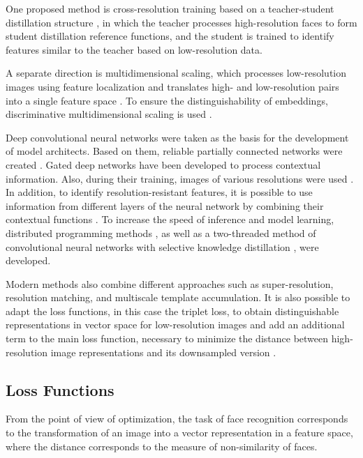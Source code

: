 \documentclass[11pt,a4paper]{article}
\begin{document}
One proposed method is cross-resolution training based on a teacher-student distillation structure \cite{15}, in which the teacher processes high-resolution faces to form student distillation reference functions, and the student is trained to identify features similar to the teacher based on low-resolution data. 

A separate direction is multidimensional scaling, which processes low-resolution images using feature localization and translates high- and low-resolution pairs into a single feature space \cite{17}. To ensure the distinguishability of embeddings, discriminative multidimensional scaling is used \cite{16}.

Deep convolutional neural networks were taken as the basis for the development of model architects. Based on them, reliable partially connected networks were created \cite{18, 19}. Gated deep networks \cite{20} have been developed to process contextual information. Also, during their training, images of various resolutions were used \cite{21}. In addition, to identify resolution-resistant features, it is possible to use information from different layers of the neural network by combining their contextual functions \cite{22}.
To increase the speed of inference and model learning, distributed programming methods \cite{23}, as well as a two-threaded method of convolutional neural networks with selective knowledge distillation \cite{15}, were developed.

Modern methods \cite{25} also combine different approaches such as super-resolution, resolution matching, and multiscale template accumulation. It is also possible to adapt the loss functions, in this case the triplet loss, to obtain distinguishable representations in vector space for low-resolution images \cite{26} and add an additional term to the main loss function, necessary to minimize the distance between high-resolution image representations and its downsampled version \cite{27}.

\subsection{Loss Functions}
From the point of view of optimization, the task of face recognition corresponds to the transformation of an image into a vector representation in a feature space, where the distance corresponds to the measure of non-similarity of faces. 
\end{document}
